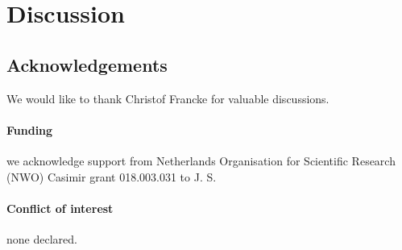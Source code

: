 \documentclass{bioinfo}
\begin{document}
\section{Discussion}


\subsection*{Acknowledgements}
We would like to thank Christof Francke for valuable discussions.
\paragraph*{Funding\textcolon} we acknowledge support from Netherlands Organisation for Scientific Research (NWO) Casimir grant 018.003.031 to J. S.
\paragraph*{Conflict of interest\textcolon} none declared.
\end{document}
